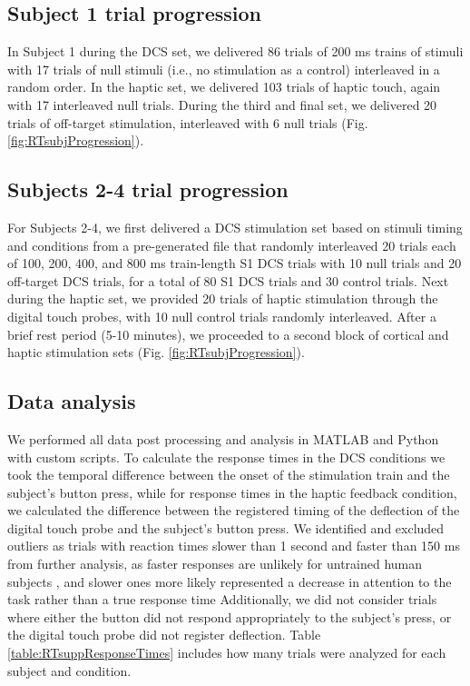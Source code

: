 \subsection{ Subject 1 trial progression}
 
In Subject 1 during the DCS set, we delivered 86 trials of 200 ms trains of stimuli with 17 trials of null stimuli (i.e., no stimulation as a control) interleaved in a random order. In the haptic set, we delivered 103 trials of haptic touch, again with 17 interleaved null trials. During the third and final set, we delivered 20 trials of off-target stimulation, interleaved with 6 null trials (Fig. \ref{fig:RTsubjProgression}).
 
\subsection{ Subjects 2-4 trial progression}


For Subjects 2-4, we first delivered a DCS stimulation set based on stimuli timing and conditions from a pre-generated file that randomly interleaved 20 trials each of 100, 200, 400, and 800 ms train-length S1 DCS trials with 10 null trials and 20 off-target DCS trials, for a total of 80 S1 DCS trials and 30 control trials. Next during the haptic set, we provided 20 trials of haptic stimulation through the digital touch probes, with 10 null control trials randomly interleaved. After a brief rest period (5-10 minutes), we proceeded to a second block of cortical and haptic stimulation sets (Fig. \ref{fig:RTsubjProgression}).
 
\subsection{Data analysis }
 
 We performed all data post processing and analysis in MATLAB and Python with custom scripts. To calculate the response times in the DCS conditions we took the temporal difference between the onset of the stimulation train and the subject’s button press, while for response times in the haptic feedback condition, we calculated the difference between the registered timing of the deflection of the digital touch probe and the subject’s button press. We identified and excluded outliers as trials with reaction times slower than 1 second and faster than 150 ms from further analysis, as faster responses are unlikely for untrained human subjects \cite{Lele1954a}, and slower ones more likely represented a decrease in attention to the task rather than a true response time Additionally, we did not consider trials where either the button did not respond appropriately to the subject’s press, or the digital touch probe did not register deflection. Table \ref{table:RTsuppResponseTimes} includes how many trials were analyzed for each subject and condition.
 
